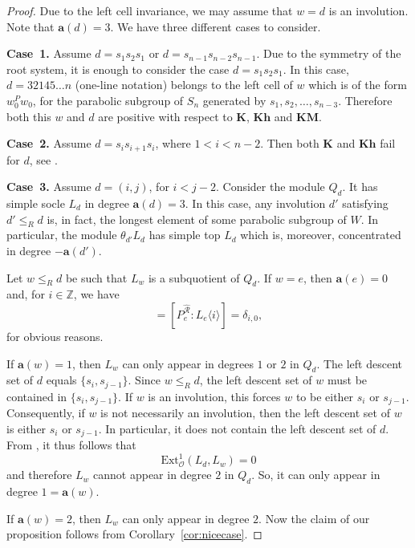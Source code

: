 \documentclass[a4paper]{amsart}
\begin{document}
\begin{proof}
Due to the left cell invariance, we may assume that $w=d$ is an involution. 
Note that $\mathbf{a}(d)=3$. We have three different cases to consider.

{\bf Case~1.} Assume $d=s_1s_2s_1$ or $d=s_{n-1}s_{n-2}s_{n-1}$.
Due to the symmetry of the root system, it is enough to consider the
case $d=s_1s_2s_1$. In this case, $d=32145\dots n$
(one-line notation) belongs to the
left cell of $w$ which is of the form $w_0^Pw_0$, for the parabolic
subgroup of $S_n$ generated by $s_1,s_2,\dots,s_{n-3}$. Therefore  both this $w$
and $d$ are positive with respect to $\mathbf{K}$, 
$\mathbf{Kh}$ and $\mathbf{KM}$.

{\bf Case~2.} Assume $d=s_is_{i+1}s_i$, where $1<i<n-2$.
Then both $\mathbf{K}$ and $\mathbf{Kh}$ fail for $d$, see
\cite[Theorem~4.3]{CM2}.

{\bf Case~3.} Assume $d=(i,j)$, for $i<j-2$. Consider the module
$Q_d$. It has simple socle $L_d$ in degree $\mathbf{a}(d)=3$.
In this case, any involution $d'$ satisfying $d'\leq_R d$
is, in fact, the longest element of some parabolic subgroup of $W$.
In particular, the module $\theta_{d'}L_d$ has simple top
$L_d$ which is, moreover, concentrated in degree $-\mathbf{a}(d')$.

Let $w\leq_R d$ be such that $L_w$ is a subquotient  of $Q_d$.
If $w=e$, then $\mathbf{a}(e)=0$ and, for $i\in\mathbb{Z}$, we have
\begin{displaymath}
[Q_d:L_e\langle i\rangle]=
[P_e^{\hat{\mathcal{R}}}:L_e\langle i\rangle]=\delta_{i,0},
\end{displaymath}
for obvious reasons.

If $\mathbf{a}(w)=1$, then $L_w$ can only appear in degrees $1$
or $2$ in $Q_d$. The left descent set of $d$ equals $\{s_i,s_{j-1}\}$.
Since $w\leq_R d$, the left descent set of $w$ must be contained
in $\{s_i,s_{j-1}\}$. If $w$ is an involution, this forces $w$
to be either $s_i$ or $s_{j-1}$. Consequently, if $w$ is not 
necessarily an involution, then the left descent set of $w$ is 
either $s_i$ or $s_{j-1}$. In particular, it does not contain the
left descent set of $d$. From \cite[Fact~3.2]{Wa}, it thus follows that
\begin{displaymath}
\mathrm{Ext}^1_{\mathcal{O}}(L_d,L_w)=0 
\end{displaymath}
and therefore $L_w$ cannot appear in degree $2$ in $Q_d$.
So, it can only appear in degree $1=\mathbf{a}(w)$.

If $\mathbf{a}(w)=2$, then $L_w$ can only appear in degree $2$.
Now the claim of our proposition follows from
Corollary~\ref{cor:nicecase}.
\end{proof}
\end{document}
